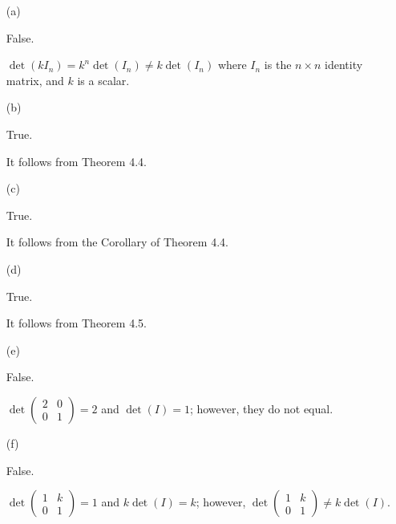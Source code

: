 \begin{Exercise}
\begin{enumerate}[(a)]
\item[(a)]
\begin{answer}
False.
\end{answer}
\begin{solution}
$\det(k I_n) = k^n\det(I_n) \neq k\det(I_n)$ where $I_n$ is the $n\times n$ identity matrix, and $k$ is a scalar.
\end{solution}

\item[(b)]
\begin{answer}
True.
\end{answer}
\begin{solution}
It follows from Theorem 4.4.
\end{solution}

\item[(c)]
\begin{answer}
True.
\end{answer}
\begin{solution}
It follows from the Corollary of Theorem 4.4.
\end{solution}

\item[(d)]
\begin{answer}
True.
\end{answer}
\begin{solution}
It follows from Theorem 4.5.
\end{solution}

\item[(e)]
\begin{answer}
False.
\end{answer}
\begin{solution}
$\det\begin{pmatrix}
2 & 0 \\
0 & 1
\end{pmatrix} = 2$ and $\det(I) = 1$; however, they do not equal.
\end{solution}

\item[(f)]
\begin{answer}
False.
\end{answer}
\begin{solution}
$\det\begin{pmatrix}
1 & k \\
0 & 1
\end{pmatrix} = 1$ and $k\det(I) = k$; however, $\det\begin{pmatrix}
1 & k \\
0 & 1
\end{pmatrix} \neq k\det(I)$.
\end{solution}


\end{enumerate}
\end{Exercise}
